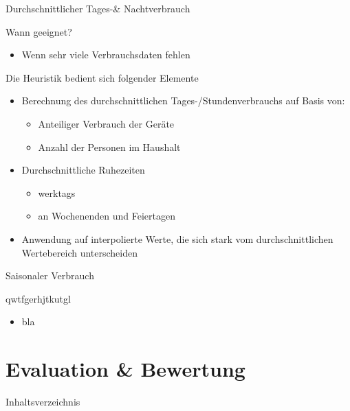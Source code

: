 \begin{frame}{Durchschnittlicher Tages-\& Nachtverbrauch}
\begin{block}{Wann geeignet?}
\begin{itemize}
\item Wenn sehr viele Verbrauchsdaten fehlen
\end{itemize}
\end{block}
\begin{block}{Die Heuristik bedient sich folgender Elemente}
\begin{itemize}
\item Berechnung des durchschnittlichen Tages-/Stundenverbrauchs auf Basis von:
\begin{itemize}
\item Anteiliger Verbrauch der Geräte
\item Anzahl der Personen im Haushalt
\end{itemize}
\item Durchschnittliche Ruhezeiten
\begin{itemize}
\item werktags
\item an Wochenenden und Feiertagen
\end{itemize}
\item Anwendung auf interpolierte Werte, die sich stark vom durchschnittlichen Wertebereich unterscheiden
\end{itemize}
\end{block}
\end{frame}

\begin{frame}{Saisonaler Verbrauch}
\begin{block}{qwtfgerhjtkutgl}
\begin{itemize}
\item bla
\end{itemize}
\end{block}
\end{frame}

\section{Evaluation \& Bewertung}
\begin{frame}{Inhaltsverzeichnis}
\tableofcontents[currentsection]
\end{frame}

